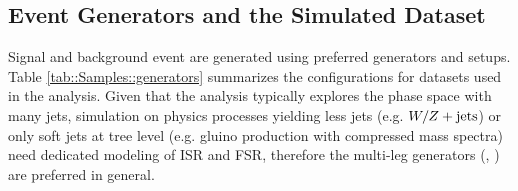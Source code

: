 \clearpage
\subsection{Event Generators and the Simulated Dataset}

Signal and background event are generated using preferred generators and setups. 
Table \ref{tab::Samples::generators} summarizes the configurations for datasets used in the analysis.
Given that the analysis typically explores the phase space with many jets, simulation on physics processes yielding less jets (e.g. $W/Z+\mathrm{jets}$) or only soft jets at tree level (e.g. gluino production with compressed mass spectra) need dedicated modeling of ISR and FSR, therefore the multi-leg generators (\sherpa, \mgmc) are preferred in general. 

